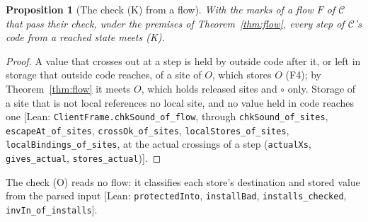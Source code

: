 \documentclass[10pt,a4paper]{article}
\newtheorem{proposition}[theorem]{Proposition}
\theoremstyle{definition}
\theoremstyle{remark}
\newcommand{\lean}[1]{\texttt{\small #1}}
\newcommand{\status}[1]{\textsf{\small[#1]}}
\newcommand{\cC}{\mathcal{C}}
\begin{document}
\begin{proposition}[The check (K) from a flow]\label{prop:kflow}
With the marks of a flow $F$ of $\cC$ that pass their check, under the
premises of Theorem~\ref{thm:flow}, every step of $\cC$'s code from a reached state
meets (K).
\end{proposition}
\begin{proof}
A value that crosses out at a step is held by outside code after it, or
left in storage that outside code reaches, of a site of $O$, which stores
$O$ (F4); by Theorem~\ref{thm:flow} it meets $O$, which holds released
sites and $\circ$ only. Storage of a site that is not local references no
local site, and no value held in code reaches one
\status{Lean: \lean{ClientFrame.chkSound\_of\_flow}, through \lean{chkSound\_of\_sites}, \lean{escapeAt\_of\_sites}, \lean{crossOk\_of\_sites}, \lean{localStores\_of\_sites}, \lean{localBindings\_of\_sites}, at the actual crossings of a step (\lean{actualXs}, \lean{gives\_actual}, \lean{stores\_actual})}.
\end{proof}

\noindent
The check (O) reads no flow: it classifies each store's destination and
stored value from the parsed input
\status{Lean: \lean{protectedInto}, \lean{installBad}, \lean{installs\_checked}, \lean{invIn\_of\_installs}}.
\end{document}
